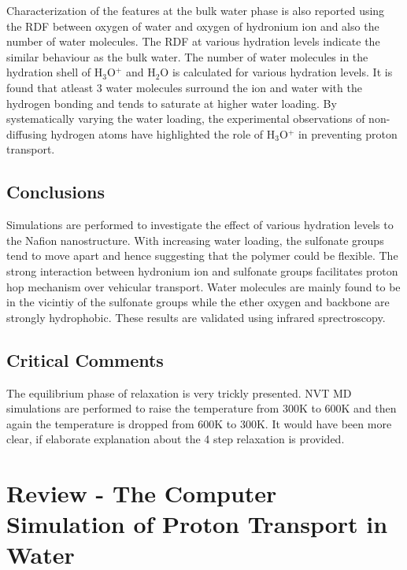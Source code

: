 \documentclass{article}
\begin{document}
Characterization of the features at the bulk water phase is also reported using the RDF between oxygen of water and oxygen of hydronium ion and also the number of water molecules. The RDF at various hydration levels indicate the similar behaviour as the bulk water. The number of water molecules in the hydration shell of H$_{\text{3}}$O$^{\text{+}}$ and H$_{\text{2}}$O is calculated for various hydration levels. It is found that atleast 3 water molecules surround the ion and water with the hydrogen bonding and tends to saturate at higher water loading. By systematically varying the water loading, the experimental observations of non-diffusing hydrogen atoms have highlighted the role of H$_{\text{3}}$O$^{\text{+}}$ in preventing proton transport. 

\subsection{Conclusions}
\label{sec-1-4}
Simulations are performed to investigate the effect of various hydration levels to the Nafion nanostructure. With increasing water loading, the sulfonate groups tend to move apart and hence suggesting that the polymer could be flexible. The strong interaction between hydronium ion and sulfonate groups facilitates proton hop mechanism over vehicular transport. Water molecules are mainly found to be in the vicintiy of the sulfonate groups while the ether oxygen and backbone are strongly hydrophobic. These results are validated using infrared sprectroscopy.

\subsection{Critical Comments}
\label{sec-1-5}
The equilibrium phase of relaxation is very trickly presented. NVT MD simulations are performed to raise the temperature from 300K to 600K and then again the temperature is dropped from 600K to 300K. It would have been more clear, if elaborate explanation about the 4 step relaxation is provided.

\section{Review - The Computer Simulation of Proton Transport in Water}
\label{sec-2}
\end{document}
